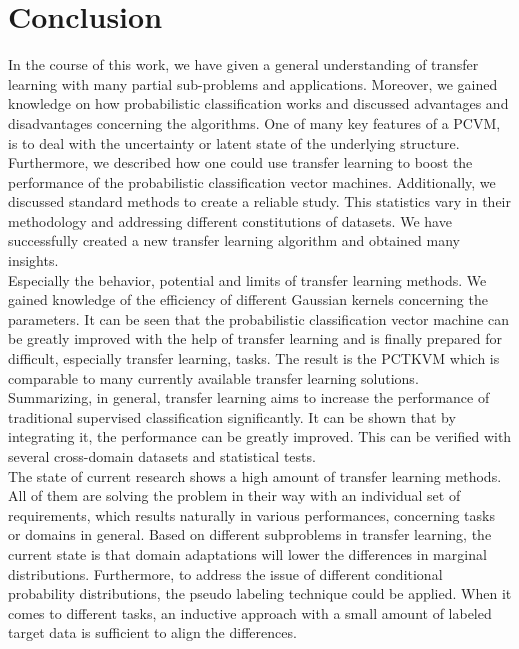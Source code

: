 \chapter{Conclusion}\label{ConChap}	
In the course of this work, we have given a general understanding of transfer learning with many partial sub-problems and applications.
Moreover, we gained knowledge on how probabilistic classification works and discussed advantages and disadvantages concerning the algorithms.
One of many key features of a \acs{PCVM}, is to deal with the uncertainty or latent state of the underlying structure.\\
Furthermore, we described how one could use transfer learning to boost the performance of the probabilistic classification vector machines.
Additionally, we discussed standard methods to create a reliable study.
This statistics vary in their methodology and addressing different constitutions of datasets.
We have successfully created a new transfer learning algorithm and obtained many insights.\\
Especially the behavior, potential and limits of transfer learning methods.
We gained knowledge of the efficiency of different Gaussian kernels concerning the parameters.
It can be seen that the probabilistic classification vector machine can be greatly improved with the help of transfer learning and is finally prepared for difficult, especially transfer learning, tasks.
The result is the \acl{PCTKVM} which is comparable to many currently available transfer learning solutions.\\ 
Summarizing, in general, transfer learning aims to increase the performance of traditional supervised classification significantly.
It can be shown that by integrating it, the performance can be greatly improved.
This can be verified with several cross-domain datasets and statistical tests.\\
The state of current research shows a high amount of transfer learning methods.\cite[p. 33]{Weiss.2016}
All of them are solving the problem in their way with an individual set of requirements, which results naturally in various performances, concerning tasks or domains in general.
Based on different subproblems in transfer learning, the current state is that domain adaptations will lower the differences in marginal distributions. Furthermore, to address the issue of different conditional probability distributions, the pseudo labeling technique could be applied. When it comes to different tasks, an inductive approach with a small amount of labeled target data is sufficient to align the differences.
